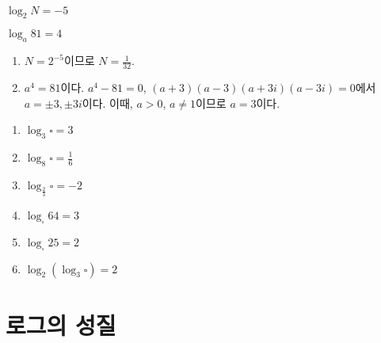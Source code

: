 \documentclass{oblivoir}
\begin{document}
\newpage
%
\label{log12}
\\
\begin{enumerate*}[itemjoin=\tabto{.5\textwidth}]
\item
\(\log_2N=-5\)
\item
\(\log_a81=4\)
\end{enumerate*}
\bigskip
\begin{mdframed}
\begin{enumerate}
\item
\(N=2^{-5}\)이므로 \(N=\frac1{32}\).
\item
\(a^4=81\)이다.
\(a^4-81=0\), \((a+3)(a-3)(a+3i)(a-3i)=0\)에서 \(a=\pm3,\pm3i\)이다.
이때, \(a>0\), \(a\neq1\)이므로 \(a=3\)이다.
\end{enumerate}
\end{mdframed}

%
\begin{enumerate}\label{log13}
\item
\(\log_3\square=3\)
\item
\(\log_8\square=\frac16\)
\item
\(\log_{\frac23}\square=-2\)
\item
\(\log_\square64=3\)
\item
\(\log_\square25=2\)
\item
\(\log_2(\log_3\square)=2\)
\end{enumerate}

\newpage
\section{로그의 성질}
\end{document}
